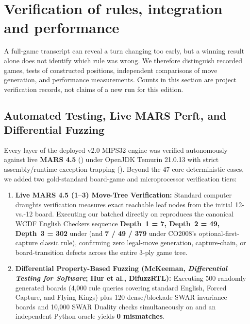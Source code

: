 \clearpage
\section{Verification of rules, integration and performance}
\label{sec:audit}

A full-game transcript can reveal a turn changing too early, but a winning result alone does not identify which rule was wrong. We therefore distinguish recorded games, tests of constructed positions, independent comparisons of move generation, and performance measurements. Counts in this section are project verification records, not claims of a new run for this edition.

\subsection{Automated Testing, Live MARS Perft, and Differential Fuzzing}
\label{sec:testing}
Every layer of the deployed v2.0 MIPS32 engine was verified autonomously against live \textbf{MARS 4.5} () under OpenJDK Temurin 21.0.13 with strict assembly/runtime exception trapping (). Beyond the 47 core deterministic  cases, we added two gold-standard board-game and microprocessor verification tiers:
\begin{enumerate}
    \item \textbf{Live MARS 4.5 (1--3) Move-Tree Verification:} Standard computer draughts verification measures exact reachable leaf nodes from the initial 12-vs.-12 board. Executing our batched  directly on  reproduces the canonical WCDF English Checkers sequence \textbf{Depth~1 = 7, Depth~2 = 49, Depth~3 = 302} under  (and \textbf{7 / 49 / 379} under CO2008's optional-first-capture classic rule), confirming zero legal-move generation, capture-chain, or board-transition defects across the entire 3-ply game tree.
    \item \textbf{Differential Property-Based Fuzzing (McKeeman, \emph{Differential Testing for Software}; Hur et al., DifuzzRTL):} Executing 500 randomly generated boards (4,000 rule queries covering standard English, Forced Capture, and Flying Kings) plus 120 dense/blockade SWAR invariance boards and 10,000 SWAR Duality checks simultaneously on  and an independent Python oracle yields \textbf{0 mismatches}.
\end{enumerate}

